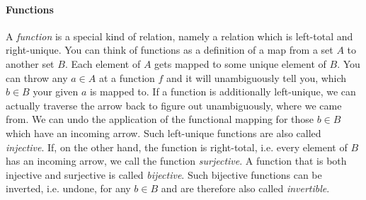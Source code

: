 








\paragraph{Functions} A \emph{function} is a special kind of relation, namely a relation which is left-total and right-unique. You can think of functions as a definition of a map from a set $A$ to another set $B$. Each element of $A$ gets mapped to some unique element of $B$. You can throw any $a \in A$ at a function $f$ and it will unambiguously tell you, which $b \in B$ your given $a$ is mapped to. If a function is additionally left-unique, we can actually traverse the arrow back to figure out unambiguously, where we came from. We can undo the application of the functional mapping for those $b \in B$ which have an incoming arrow. Such left-unique functions are also called \emph{injective}. If, on the other hand, the function is right-total, i.e. every element of $B$ has an incoming arrow, we call the function \emph{surjective}. A function that is both injective and surjective is called \emph{bijective}. Such bijective functions can be inverted, i.e. undone, for any $b \in B$ and are therefore also called \emph{invertible}.

